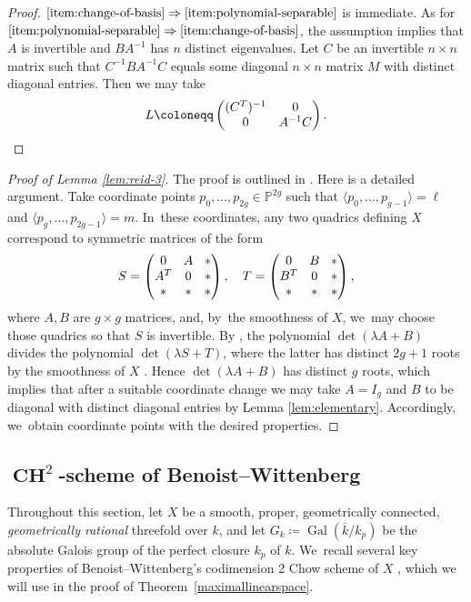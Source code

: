 \documentclass[JEP,XML,SOM,Unicode,NoEqCountersInSection,published]{cedram}
\theoremstyle{plain}
\theoremstyle{definition}
\DeclareMathOperator{\bCH}{\mathbf{CH}}
\DeclareMathOperator{\Gal}{Gal}
\renewcommand\P{\mathbb{P}}
\begin{document}
\begin{proof}
$\eqref{item:change-of-basis}\Rightarrow\eqref{item:polynomial-separable}$
is immediate.
As for $\eqref{item:polynomial-separable}\Rightarrow\eqref{item:change-of-basis}$,
the assumption implies that $A$ is invertible and $BA^{-1}$ has $n$ distinct eigenvalues.
Let $C$ be an invertible $n\times n$ matrix such that $C^{-1}BA^{-1}C$ equals some diagonal $n\times n$ matrix $M$ with distinct diagonal entries.
Then we may take
\[
L \coloneqq \begin{pmatrix}(C^T)^{-1} & 0\\
0& A^{-1}C\end{pmatrix}.\qedhere
\]
\end{proof}
\begin{proof}[Proof of Lemma \ref{lem:reid-3}]
The proof is outlined in
\cite[p.\,44]{Reid-thesis}.
Here is a detailed argument.
Take coordinate points $p_0,\dots, p_{2g}\in \P^{2g}$ such that $\langle p_0,\dots,p_{g-1}\rangle =\ell$ and $\langle p_g,\dots,p_{2g-1}\rangle =m$. In~these coordinates, any two quadrics defining $X$ correspond to symmetric matrices of the form
\[\arraycolsep4.5pt
S=
\begin{pmatrix}
0 & A & *\\
A^T & 0 & *\\
* & * & *
\end{pmatrix}, \quad
T=\begin{pmatrix}
0 & B & *\\
B^T & 0 & *\\
* & * & *
\end{pmatrix},
\]
where $A, B$ are $g\times g$ matrices,
and, by~the smoothness of $X$, we~may choose those quadrics so that $S$ is invertible.
By \cite[Cor.\,3.7]{Reid-thesis}, the polynomial $\det(\lambda A+B)$ divides the polynomial $\det(\lambda S+ T)$,
where the latter has distinct $2g+1$ roots by the smoothness of $X$ \cite[Prop.\,2.1]{Reid-thesis}.
Hence $\det(\lambda A+ B)$ has distinct $g$ roots, which implies that after a suitable coordinate change
we may take $A=I_g$ and $B$ to be diagonal with distinct diagonal entries by Lemma \ref{lem:elementary}.
Accordingly, we~obtain coordinate points with the desired properties.
\end{proof}

\subsection{$\bCH^2$-scheme of Benoist--Wittenberg}\label{sec:CH2-scheme} Throughout this section, let \(X\) be a smooth, proper, geometrically connected, \emph{geometrically rational} threefold over \(k\), and let $G_k \coloneqq \Gal(\overline{k}/k_p)$ be the absolute Galois group of the perfect closure $k_p$ of $k$. We~recall several key properties of Benoist--Wittenberg's codimension 2 Chow scheme of \(X\) \cite{BW-IJ}, which we will use in the proof of Theorem~\ref{maximallinearspace}.
\end{document}
